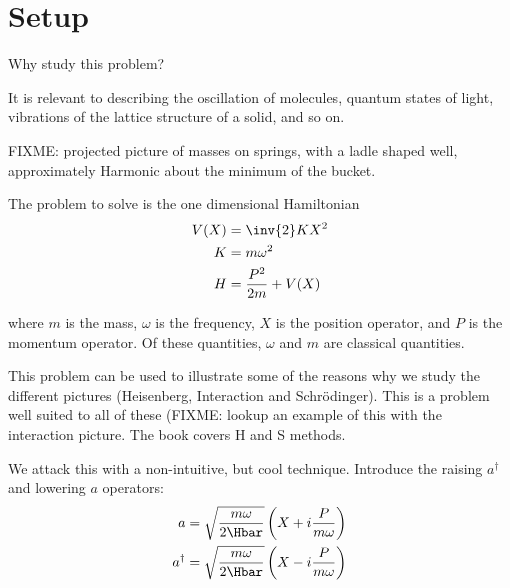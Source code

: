 %
%

\section{Setup}
Why study this problem?

It is relevant to describing the oscillation of molecules, quantum states of light, vibrations of the lattice structure of a solid, and so on.

FIXME: projected picture of masses on springs, with a ladle shaped well, approximately Harmonic about the minimum of the bucket.

The problem to solve is the one dimensional Hamiltonian
%
\begin{equation}\label{eqn:PHY356FLecture11:10}
\begin{aligned}
V(X) &= \inv{2} K X^2 \\
K &= m \omega^2 \\
H &= \frac{P^2}{2m} + V(X)
\end{aligned}
\end{equation}

where \(m\) is the mass, \(\omega\) is the frequency, \(X\) is the position operator, and \(P\) is the momentum operator.  Of these quantities, \(\omega\) and \(m\) are classical quantities.

This problem can be used to illustrate some of the reasons why we study the different pictures (Heisenberg, Interaction and Schr\"{o}dinger).  This is a problem well suited to all of these (FIXME: lookup an example of this with the interaction picture.  The book covers H and S methods.

We attack this with a non-intuitive, but cool technique.  Introduce the raising \(a^\dagger\) and lowering \(a\) operators:
%
\begin{equation}\label{eqn:PHY356FLecture11:20}
\begin{aligned}
a &= \sqrt{\frac{m \omega}{2 \Hbar}} \left( X + i \frac{P}{m\omega} \right) \\
a^\dagger &= \sqrt{\frac{m \omega}{2 \Hbar}} \left( X - i \frac{P}{m\omega} \right)
\end{aligned}
\end{equation}

